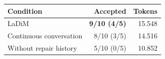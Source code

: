 \begin{tabular*}{\linewidth}{@{\extracolsep{\fill}}lrr@{}}
\toprule
\textbf{Condition} & \textbf{Accepted} & \textbf{Tokens} \\
\midrule
LaDiM & \textbf{9/10 (4/5)} & 15.548 \\
Continuous conversation & 8/10 (3/5) & 14.516 \\
Without repair history & 5/10 (0/5) & 10.852 \\
\bottomrule
\end{tabular*}
